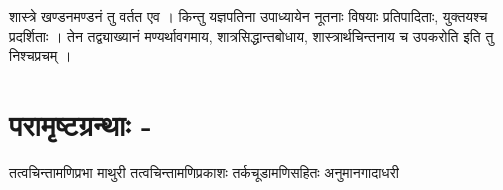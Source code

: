 शास्त्रे खण्डनमण्डनं तु वर्तत एव । किन्तु यज्ञपतिना उपाध्यायेन नूतनाः विषयाः प्रतिपादिताः, युक्तयश्च  प्रदर्शिताः । तेन तद्व्याख्यानं मण्यर्थावगमाय, शात्रसिद्धान्तबोधाय, शास्त्रार्थचिन्तनाय च उपकरोति इति तु निश्चप्रचम् ।

\section*{परामृष्टग्रन्थाः -}

\begin{thebibliography}{99}
 तत्वचिन्तामणिप्रभा 
 माथुरी 
 तत्वचिन्तामणिप्रकाशः तर्कचूडामणिसहितः
 अनुमानगादाधरी
\end{thebibliography}

\articleend
